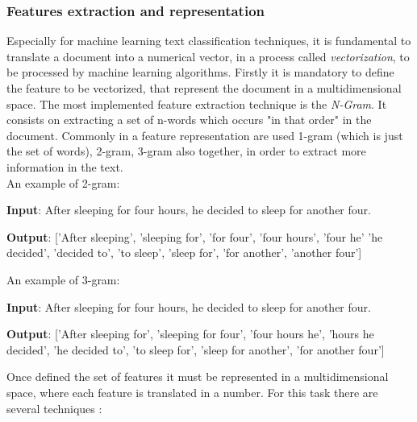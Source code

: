 \subsubsection{Features extraction and representation}
Especially for machine learning text classification techniques, it is fundamental to translate a document into a numerical vector, in a process called \textit{vectorization}, to be processed by machine learning algorithms. Firstly it is mandatory to define the feature to be vectorized, that represent the document in a multidimensional space. The most implemented feature extraction technique is the \textit{N-Gram}. It consists on extracting a set of n-words which occurs "in that order" in the document. Commonly in a feature representation are used 1-gram (which is just the set of words), 2-gram, 3-gram also together, in order to extract more information in the text.\\
An example of 2-gram:
\begin{description}
	\item \textbf{Input}: After sleeping for four hours, he decided to sleep for another four.
	\item \textbf{Output}: ['After sleeping', 'sleeping for', 'for four', 'four hours', 'four he' 'he decided', 'decided to', 'to sleep', 'sleep for', 'for another', 'another four']
\end{description}
An example of 3-gram:
\begin{description}
	\item \textbf{Input}: After sleeping for four hours, he decided to sleep for another four.
	\item \textbf{Output}: ['After sleeping for', 'sleeping for four', 'four hours he', 'hours he decided', 'he decided to', 'to sleep for', 'sleep for another', 'for another four']
\end{description}
Once defined the set of features it must be represented in a multidimensional space, where each feature is translated in a number. For this task there are several techniques \cite{DBLP:journals/corr/abs-1904-08067}:

